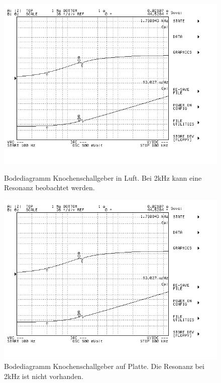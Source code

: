   \begin{figure}[!tbph]
    \centering
    \begin{minipage}[b]{0.45\textwidth}
	\includegraphics[width=\textwidth]{graphics/kurve_knochenschallgeber_1.png}
	\caption{Bodediagramm Knochenschallgeber in Luft. Bei 2kHz kann eine Resonanz beobachtet werden.}
	\label{fig:bode_knochenschall1}
    \end{minipage}
    \hfill
    \begin{minipage}[b]{0.45\textwidth}
      \includegraphics[width=\textwidth]{graphics/kurve_knochenschallgeber_1.png}
	\caption{Bodediagramm Knochenschallgeber auf Platte. Die Resonanz bei 2kHz ist nicht vorhanden.}
	\label{fig:bode_knochenschall2}
    \end{minipage}
  \end{figure}
  
